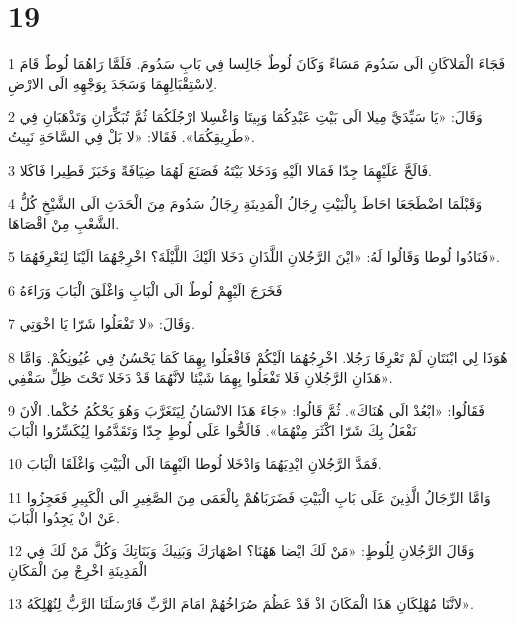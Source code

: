\chapter{19}

\par 1 فَجَاءَ الْمَلاكَانِ الَى سَدُومَ مَسَاءً وَكَانَ لُوطٌ جَالِسا فِي بَابِ سَدُومَ. فَلَمَّا رَاهُمَا لُوطٌ قَامَ لِاسْتِقْبَالِهِمَا وَسَجَدَ بِوَجْهِهِ الَى الارْضِ.
\par 2 وَقَالَ: «يَا سَيِّدَيَّ مِيلا الَى بَيْتِ عَبْدِكُمَا وَبِيتَا وَاغْسِلا ارْجُلَكُمَا ثُمَّ تُبَكِّرَانِ وَتَذْهَبَانِ فِي طَرِيقِكُمَا». فَقَالا: «لا بَلْ فِي السَّاحَةِ نَبِيتُ».
\par 3 فَالَحَّ عَلَيْهِمَا جِدّا فَمَالا الَيْهِ وَدَخَلا بَيْتَهُ فَصَنَعَ لَهُمَا ضِيَافَةً وَخَبَزَ فَطِيرا فَاكَلا.
\par 4 وَقَبْلَمَا اضْطَجَعَا احَاطَ بِالْبَيْتِ رِجَالُ الْمَدِينَةِ رِجَالُ سَدُومَ مِنَ الْحَدَثِ الَى الشَّيْخِ كُلُّ الشَّعْبِ مِنْ اقْصَاهَا.
\par 5 فَنَادُوا لُوطا وَقَالُوا لَهُ: «ايْنَ الرَّجُلانِ اللَّذَانِ دَخَلا الَيْكَ اللَّيْلَةَ؟ اخْرِجْهُمَا الَيْنَا لِنَعْرِفَهُمَا».
\par 6 فَخَرَجَ الَيْهِمْ لُوطٌ الَى الْبَابِ وَاغْلَقَ الْبَابَ وَرَاءَهُ
\par 7 وَقَالَ: «لا تَفْعَلُوا شَرّا يَا اخْوَتِي.
\par 8 هُوَذَا لِي ابْنَتَانِ لَمْ تَعْرِفَا رَجُلا. اخْرِجُهُمَا الَيْكُمْ فَافْعَلُوا بِهِمَا كَمَا يَحْسُنُ فِي عُيُونِكُمْ. وَامَّا هَذَانِ الرَّجُلانِ فَلا تَفْعَلُوا بِهِمَا شَيْئا لانَّهُمَا قَدْ دَخَلا تَحْتَ ظِلِّ سَقْفِي».
\par 9 فَقَالُوا: «ابْعُدْ الَى هُنَاكَ». ثُمَّ قَالُوا: «جَاءَ هَذَا الانْسَانُ لِيَتَغَرَّبَ وَهُوَ يَحْكُمُ حُكْما. الْانَ نَفْعَلُ بِكَ شَرّا اكْثَرَ مِنْهُمَا». فَالَحُّوا عَلَى لُوطٍ جِدّا وَتَقَدَّمُوا لِيُكَسِّرُوا الْبَابَ
\par 10 فَمَدَّ الرَّجُلانِ ايْدِيَهُمَا وَادْخَلا لُوطا الَيْهِمَا الَى الْبَيْتِ وَاغْلَقَا الْبَابَ.
\par 11 وَامَّا الرِّجَالُ الَّذِينَ عَلَى بَابِ الْبَيْتِ فَضَرَبَاهُمْ بِالْعَمَى مِنَ الصَّغِيرِ الَى الْكَبِيرِ فَعَجِزُوا عَنْ انْ يَجِدُوا الْبَابَ.
\par 12 وَقَالَ الرَّجُلانِ لِلُوطٍ: «مَنْ لَكَ ايْضا هَهُنَا؟ اصْهَارَكَ وَبَنِيكَ وَبَنَاتِكَ وَكُلَّ مَنْ لَكَ فِي الْمَدِينَةِ اخْرِجْ مِنَ الْمَكَانِ
\par 13 لانَّنَا مُهْلِكَانِ هَذَا الْمَكَانَ اذْ قَدْ عَظُمَ صُرَاخُهُمْ امَامَ الرَّبِّ فَارْسَلَنَا الرَّبُّ لِنُهْلِكَهُ».
